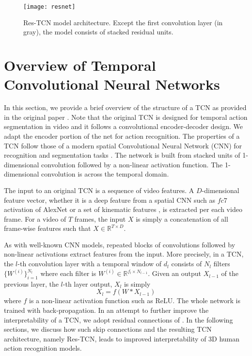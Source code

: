 \documentclass[10pt,twocolumn,letterpaper]{article}
\begin{document}
\begin{figure*}
\begin{center}
\texttt{[image: resnet]}
\end{center}
   \caption{Res-TCN model architecture. Except the first convolution layer (in gray), the model consists of stacked residual units.}
\label{fig:model}
\end{figure*}

\section{Overview of Temporal Convolutional Neural Networks}
In this section, we provide a brief overview of the structure of a TCN as provided in the original paper \cite{TCN}. Note that the original TCN is designed for temporal action segmentation in video and it follows a convolutional encoder-decoder design. We adapt the encoder portion of the net for action recognition. The properties of a TCN follow those of a modern spatial Convolutional Neural Network (CNN) for recognition \cite{lecun, alexnet, vgg} and segmentation tasks  \cite{segnet}. The network is built from stacked units of 1-dimensional convolution followed by a non-linear activation function. The 1-dimensional convolution is across the temporal domain.

The input to an original TCN is a sequence of video features. A $D$-dimensional feature vector, whether it is a deep feature from a spatial CNN such as $fc7$ activation of AlexNet \cite{alexnet} or a set of kinematic features \cite{TCN}, is extracted per each video frame. For a video of $T$ frames, the input $X$ is simply a concatenation of all frame-wise features such that $X \in \mathbb{R}^{T \times D}$. 

As with well-known CNN models, repeated blocks of convolutions followed by non-linear activations extract features from the input. More precisely, in a TCN, the $l$-th convolution layer with a temporal window of $d_l$ consists of $N_l$ filters $\{W^{(i)}\}_{i=1}^{N_l}$ where each filter is $W^{(i)} \in \mathbb{R}^{f_l \times N_{l-1}}$. Given an output $X_{l-1}$ of the previous layer, the $l$-th layer output, $X_l$ is simply
\begin{equation} \label{eq:1}
 X_l = f(W*X_{l-1})
\end{equation}
where $f$ is a non-linear activation function such as ReLU. The whole network is trained with back-propagation. In an attempt to further improve the interpretability of a TCN, we adopt residual connections of \cite{resnet}. In the following sections, we discuss how such skip connections and the resulting TCN architecture, namely Res-TCN, leads to improved interpretability of 3D human action recognition models. 
\end{document}
